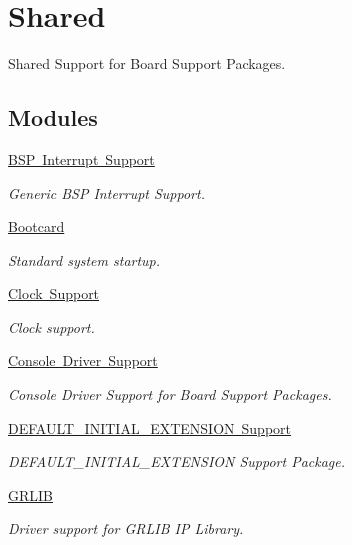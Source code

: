 \hypertarget{group__RTEMSBSPsShared}{}\section{Shared}
\label{group__RTEMSBSPsShared}


Shared Support for Board Support Packages.  


\subsection*{Modules}
\begin{DoxyCompactItemize}
\item 
\mbox{\hyperlink{group__bsp__interrupt}{B\+S\+P Interrupt Support}}
\begin{DoxyCompactList}\small\item\em Generic B\+SP Interrupt Support. \end{DoxyCompactList}\item 
\mbox{\hyperlink{group__RTEMSBSPsSharedStartup}{Bootcard}}
\begin{DoxyCompactList}\small\item\em Standard system startup. \end{DoxyCompactList}\item 
\mbox{\hyperlink{group__bsp__clock}{Clock Support}}
\begin{DoxyCompactList}\small\item\em Clock support. \end{DoxyCompactList}\item 
\mbox{\hyperlink{group__RTEMSBSPsSharedConsole}{Console Driver Support}}
\begin{DoxyCompactList}\small\item\em Console Driver Support for Board Support Packages. \end{DoxyCompactList}\item 
\mbox{\hyperlink{group__shared__defaultinitialextension}{D\+E\+F\+A\+U\+L\+T\+\_\+\+I\+N\+I\+T\+I\+A\+L\+\_\+\+E\+X\+T\+E\+N\+S\+I\+O\+N Support}}
\begin{DoxyCompactList}\small\item\em D\+E\+F\+A\+U\+L\+T\+\_\+\+I\+N\+I\+T\+I\+A\+L\+\_\+\+E\+X\+T\+E\+N\+S\+I\+ON Support Package. \end{DoxyCompactList}\item 
\mbox{\hyperlink{group__RTEMSBSPsSharedGRLIB}{G\+R\+L\+IB}}
\begin{DoxyCompactList}\small\item\em Driver support for G\+R\+L\+IB IP Library. \end{DoxyCompactList}\item 

\end{DoxyCompactItemize}
